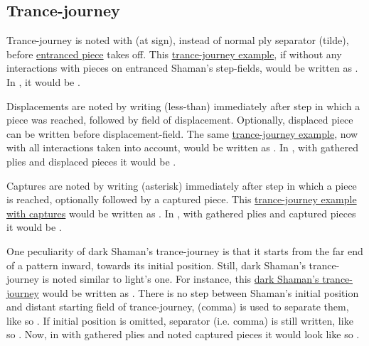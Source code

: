 \subsection*{Trance-journey}
\label{sec:Appendix/Notation/Trance-journey}

Trance-journey is noted with  (at sign), instead of normal ply separator \alg{\~{}}
(tilde), before \hyperref[fig:scn_cot_072_entrancement_step]{entranced piece} takes off. This
\hyperref[fig:scn_cot_086_light_light_shaman_interaction_start]{trance-journey example},
if without any interactions with pieces on entranced Shaman's step-fields, would be written
as . In , it would be .

Displacements are noted by writing \alg{<} (less-than) immediately after step in which a
piece was reached, followed by field of displacement. Optionally, displaced piece can be
written before displacement-field. The same
\hyperref[fig:scn_cot_087_light_light_shaman_interaction_end]{trance-journey example},
now with all interactions taken into account, would be written as
.
In , with gathered plies and displaced pieces it would be \newline
{}.

Captures are noted by writing \alg{*} (asterisk) immediately after step in which a piece
is reached, optionally followed by a captured piece. This
\hyperref[fig:scn_cot_089_dark_light_shaman_interaction_end]{trance-journey example with captures}
would be written as \newline
{}. In , with gathered plies and
captured pieces it would be \newline
{}.

One peculiarity of dark Shaman's trance-journey is that it starts from the far end
of a pattern inward, towards its initial position. Still, dark Shaman's trance-journey
is noted similar to light's one. For instance, this
\hyperref[fig:scn_cot_090_dark_dark_shaman_interaction_start]{dark Shaman's trance-journey}
would be written as .
There is no step between Shaman's initial position and distant starting field of
trance-journey, \alg{,} (comma) is used to separate them, like so
.
If initial position is omitted, separator (i.e. comma) is still written, like so
. Now, in  with gathered plies
and noted captured pieces it would look like so \newline
{}.

